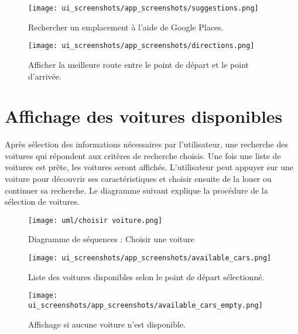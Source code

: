 \begin{multicols}{2}
    \begin{figure}[H]
        \centering
        \texttt{[image: ui\_screenshots/app\_screenshots/suggestions.png]}
        \captionsetup{justification=centering}
        \caption{Rechercher un emplacement à l'aide de Google Places.}
        \label{fig:app_transfer_suggestions}
    \end{figure}
    \begin{figure}[H]
        \centering
        \texttt{[image: ui\_screenshots/app\_screenshots/directions.png]}
        \captionsetup{justification=centering}
        \caption{Afficher la meilleure route entre le point de départ et le point d'arrivée.}
        \label{fig:app_transfer_directions}
    \end{figure}
\end{multicols}
\section{Affichage des voitures disponibles}
Après sélection des informations nécessaires par l'utilisateur, une recherche des voitures qui répondent aux critères de recherche choisis. Une fois une liste de voitures est prête, les voitures seront affichés. L'utilisateur peut appuyer sur une voiture pour découvrir ses caractéristiques et choisir ensuite de la louer ou continuer sa recherche.
Le diagramme suivant explique la procédure de la sélection de voitures.
\vspace{.5cm}
\begin{figure}[H]
    \centering
    \texttt{[image: uml/choisir voiture.png]}
    \vspace{.5cm}
    \caption{Diagramme de séquences : Choisir une voiture}
    \label{fig:seq_car_select}
\end{figure}
\clearpage
\begin{multicols}{2}
    \begin{figure}[H]
        \centering
        \texttt{[image: ui\_screenshots/app\_screenshots/available\_cars.png]}
        \captionsetup{justification=centering}
        \caption{Liste des voitures disponibles selon le point de départ sélectionné.}
        \label{fig:app_available_cars}
    \end{figure}
    \begin{figure}[H]
        \centering
        \texttt{[image: ui\_screenshots/app\_screenshots/available\_cars\_empty.png]}
        \captionsetup{justification=centering}
        \caption{Affichage si aucune voiture n'est disponible.}
        \label{fig:app_available_cars_empty}
    \end{figure}
\end{multicols}
